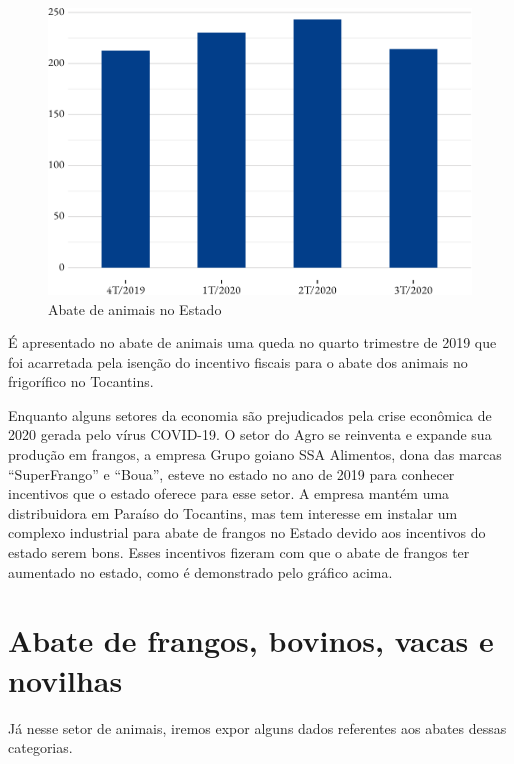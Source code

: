 \begin{figure}[h]
	\caption{Abate de animais no Estado}
	\includegraphics{fig/abate_total-1.pdf}
\end{figure}

\par É apresentado no abate de animais uma queda no quarto trimestre de 2019 que foi acarretada pela isenção do incentivo fiscais para o abate dos animais no frigorífico no Tocantins. 

\par Enquanto alguns setores da economia são prejudicados pela crise econômica de 2020 gerada pelo vírus COVID-19. O setor do Agro se reinventa e expande sua produção em frangos, a empresa Grupo goiano SSA Alimentos, dona das marcas “SuperFrango” e “Boua”, esteve no estado no ano de 2019 para conhecer incentivos que o estado oferece para esse setor. A empresa mantém uma distribuidora em Paraíso do Tocantins, mas tem interesse em instalar um complexo industrial para abate de frangos no Estado devido aos incentivos do estado serem bons. Esses incentivos fizeram com que o abate de frangos ter aumentado no estado, como é demonstrado pelo gráfico acima.

\section{Abate de frangos, bovinos, vacas e novilhas}

\par Já nesse setor de animais, iremos expor alguns dados referentes aos abates dessas categorias.

